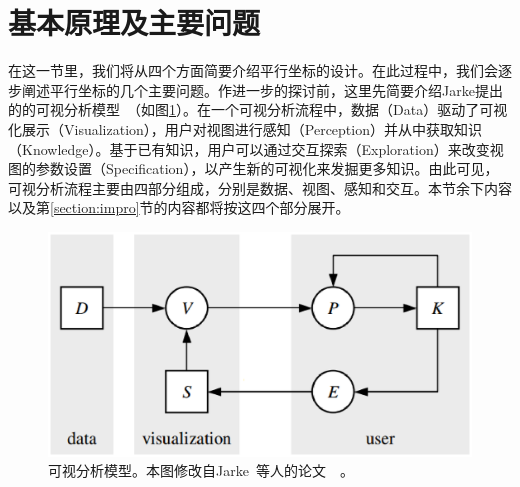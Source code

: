 \documentclass[12pt,twocolumn]{article}
\begin{document}
\section{基本原理及主要问题}
\label{section:basics&prob}
在这一节里，我们将从四个方面简要介绍平行坐标的设计。在此过程中，我们会逐步阐述平行坐标的几个主要问题。作进一步的探讨前，这里先简要介绍Jarke提出的的可视分析模型~\citep{van2005value}（如图\ref{fig:Vis_model}）。在一个可视分析流程中，数据（Data）驱动了可视化展示（Visualization），用户对视图进行感知（Perception）并从中获取知识（Knowledge）。基于已有知识，用户可以通过交互探索（Exploration）来改变视图的参数设置（Specification），以产生新的可视化来发掘更多知识。由此可见，可视分析流程主要由四部分组成，分别是数据、视图、感知和交互。本节余下内容以及第\ref{section:impro}节的内容都将按这四个部分展开。

\begin{figure}[!htb]
\centering
\includegraphics[width=0.9\linewidth]{images/Vis_model.eps}
\caption{\label{fig:Vis_model}可视分析模型。本图修改自Jarke~等人的论文~\citep{van2005value}~。
}
\end{figure}
\end{document}

